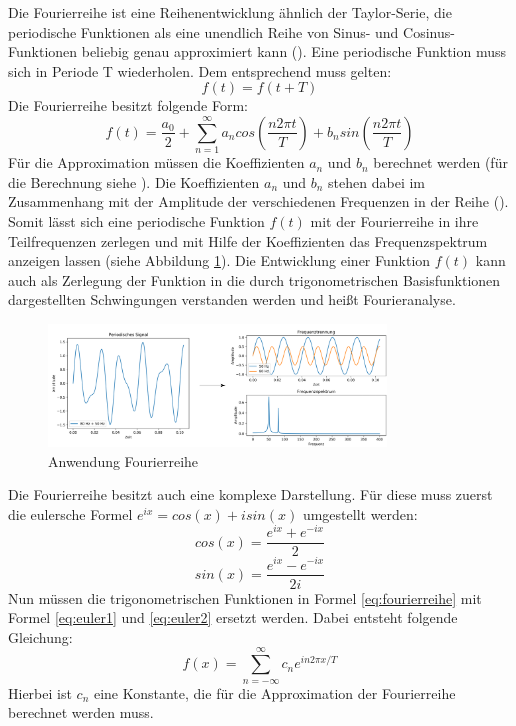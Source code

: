 Die Fourierreihe ist eine Reihenentwicklung ähnlich der Taylor-Serie, die periodische Funktionen als eine unendlich Reihe von Sinus- und Cosinus-Funktionen beliebig genau approximiert kann (\cite[K. 11.4]{krenor 11}). Eine periodische Funktion muss sich in Periode T wiederholen. Dem entsprechend muss gelten:
\begin{equation}
f(t) = f(t + T)
\end{equation}
Die Fourierreihe besitzt folgende Form:
\begin{equation}
f(t) = \frac{a_0}{2} + \sum_{n=1}^{\infty} a_n cos \left( \frac{n2 \pi t}{T} \right) + b_n sin \left( \frac{n2 \pi t}{T} \right)
\label{eq:fourierreihe}
\end{equation}
Für die Approximation müssen die Koeffizienten $a_n$ und $b_n$ berechnet werden (für die Berechnung siehe \cite[K. 11.2]{krenor 11}). Die Koeffizienten $a_n$ und $b_n$ stehen dabei im Zusammenhang mit der Amplitude der verschiedenen Frequenzen in der Reihe (\cite[K. 2.5]{scho 05}). Somit lässt sich eine periodische Funktion $f(t)$ mit der Fourierreihe in ihre Teilfrequenzen zerlegen und mit Hilfe der Koeffizienten das Frequenzspektrum anzeigen lassen (siehe Abbildung \ref{fig:fourierreihe}).
\newline
Die Entwicklung einer Funktion $f(t)$ kann auch als Zerlegung der Funktion in die durch trigonometrischen Basisfunktionen dargestellten Schwingungen verstanden werden und heißt Fourieranalyse.
\begin{figure}
\centering
 \includegraphics[width=0.8\textwidth]{Pictures/Fourierreihe.png}
\caption{Anwendung Fourierreihe}
\label{fig:fourierreihe}
\end{figure} 
\newline
Die Fourierreihe besitzt auch eine komplexe Darstellung. Für diese muss zuerst die eulersche Formel $e^{ix} = cos(x) + i sin(x)$ umgestellt werden:
\begin{equation}
cos(x) = \frac{e^{ix} + e^{-ix}}{2}
\label{eq:euler1}
\end{equation}
\begin{equation}
sin(x) = \frac{e^{ix} - e^{-ix}}{2i}
\label{eq:euler2}
\end{equation}
Nun müssen die trigonometrischen Funktionen in Formel \ref{eq:fourierreihe} mit Formel \ref{eq:euler1} und \ref{eq:euler2} ersetzt werden.
Dabei entsteht folgende Gleichung:
\begin{equation}
f(x) = \sum_{n=-\infty}^{\infty} c_{n} e^{in2\pi x / T}
\label{FS}
\end{equation}
Hierbei ist $c_n$ eine Konstante, die für die Approximation der Fourierreihe berechnet werden muss.


